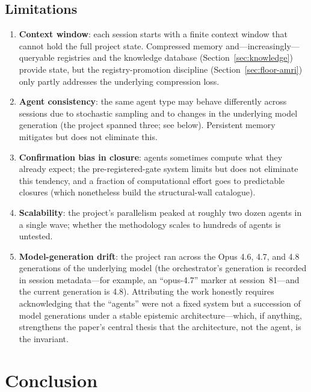 \documentclass[12pt,a4paper]{article}
\begin{document}
\subsection{Limitations}

\begin{enumerate}
    \item \textbf{Context window}: each session starts with a finite context window that cannot hold the full project state. Compressed memory and---increasingly---queryable registries and the knowledge database (Section~\ref{sec:knowledge}) provide state, but the registry-promotion discipline (Section~\ref{sec:floor-amri}) only partly addresses the underlying compression loss.
    \item \textbf{Agent consistency}: the same agent type may behave differently across sessions due to stochastic sampling and to changes in the underlying model generation (the project spanned three; see below). Persistent memory mitigates but does not eliminate this.
    \item \textbf{Confirmation bias in closure}: agents sometimes compute what they already expect; the pre-registered-gate system limits but does not eliminate this tendency, and a fraction of computational effort goes to predictable closures (which nonetheless build the structural-wall catalogue).
    \item \textbf{Scalability}: the project's parallelism peaked at roughly two dozen agents in a single wave; whether the methodology scales to hundreds of agents is untested.
    \item \textbf{Model-generation drift}: the project ran across the Opus 4.6, 4.7, and 4.8 generations of the underlying model (the orchestrator's generation is recorded in session metadata---for example, an ``opus-4.7'' marker at session~81---and the current generation is 4.8). Attributing the work honestly requires acknowledging that the ``agents'' were not a fixed system but a succession of model generations under a stable epistemic architecture---which, if anything, strengthens the paper's central thesis that the architecture, not the agent, is the invariant.
\end{enumerate}

\section{Conclusion}
\label{sec:conclusion}
\end{document}
